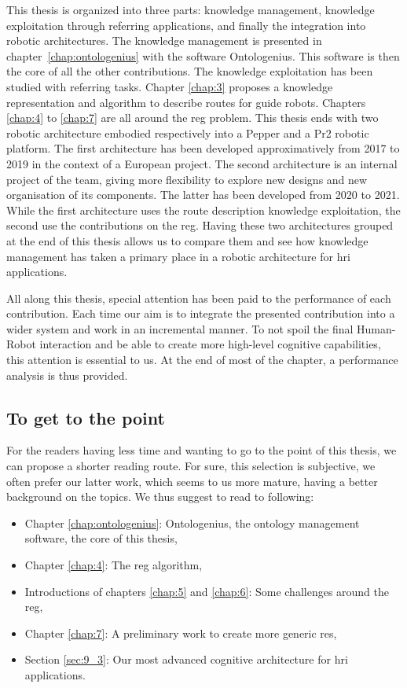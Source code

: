 This thesis is organized into three parts: knowledge management, knowledge exploitation through referring applications, and finally the integration into robotic architectures. The knowledge management is presented in chapter~\ref{chap:ontologenius} with the software Ontologenius. This software is then the core of all the other contributions. The knowledge exploitation has been studied with referring tasks. Chapter \ref{chap:3} proposes a knowledge representation and algorithm to describe routes for guide robots. Chapters \ref{chap:4} to \ref{chap:7} are all around the \acrlong{reg} problem. This thesis ends with two robotic architecture embodied respectively into a Pepper and a Pr2 robotic platform. The first architecture has been developed approximatively from 2017 to 2019 in the context of a European project. The second architecture is an internal project of the team, giving more flexibility to explore new designs and new organisation of its components. The latter has been developed from 2020 to 2021. While the first architecture uses the route description knowledge exploitation, the second use the contributions on the \acrlong{reg}. Having these two architectures grouped at the end of this thesis allows us to compare them and see how knowledge management has taken a primary place in a robotic architecture for \acrlong{hri} applications.

All along this thesis, special attention has been paid to the performance of each contribution. Each time our aim is to integrate the presented contribution into a wider system and work in an incremental manner. To not spoil the final Human-Robot interaction and be able to create more high-level cognitive capabilities, this attention is essential to us. At the end of most of the chapter, a performance analysis is thus provided.

\subsection*{To get to the point}

For the readers having less time and wanting to go to the point of this thesis, we can propose a shorter reading route. For sure, this selection is subjective, we often prefer our latter work, which seems to us more mature, having a better background on the topics. We thus suggest to read to following:

\begin{itemize}
  \item Chapter \ref{chap:ontologenius}: Ontologenius, the ontology management software, the core of this thesis,
  \item Chapter \ref{chap:4}: The \acrlong{reg} algorithm,
  \item Introductions of chapters \ref{chap:5} and \ref{chap:6}: Some challenges around the \acrlong{reg},
  \item Chapter \ref{chap:7}: A preliminary work to create more generic \acrlong{re}s,
  \item Section \ref{sec:9_3}: Our most advanced cognitive architecture for \acrlong{hri} applications.
\end{itemize}